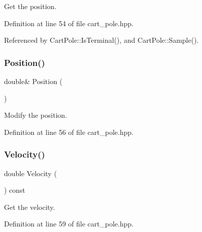Get the position. 



Definition at line 54 of file cart\+\_\+pole.\+hpp.



Referenced by Cart\+Pole\+::\+Is\+Terminal(), and Cart\+Pole\+::\+Sample().

\mbox{\label{classmlpack_1_1rl_1_1CartPole_1_1State_a005c39713bc5c65715a94572bfb5fc29}} 
\subsubsection{Position()\hspace{0.1cm}{\footnotesize\ttfamily [2/2]}}
{\footnotesize\ttfamily double\& Position (\begin{DoxyParamCaption}{ }\end{DoxyParamCaption})\hspace{0.3cm}{\ttfamily [inline]}}



Modify the position. 



Definition at line 56 of file cart\+\_\+pole.\+hpp.

\mbox{\label{classmlpack_1_1rl_1_1CartPole_1_1State_a5281cef88d4e272d6cb8581bff91195a}} 
\subsubsection{Velocity()\hspace{0.1cm}{\footnotesize\ttfamily [1/2]}}
{\footnotesize\ttfamily double Velocity (\begin{DoxyParamCaption}{ }\end{DoxyParamCaption}) const\hspace{0.3cm}{\ttfamily [inline]}}



Get the velocity. 



Definition at line 59 of file cart\+\_\+pole.\+hpp.



